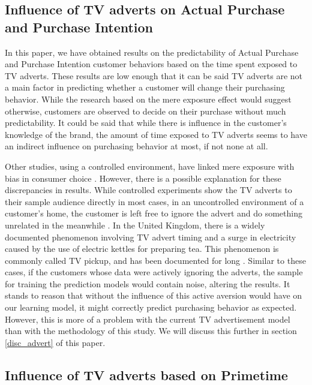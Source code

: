 \documentclass[review]{elsarticle}
\begin{document}
\subsection{Influence of TV adverts on Actual Purchase and Purchase Intention}
\label{disc_ap_pi}

In this paper, we have obtained results on the predictability of Actual Purchase and Purchase Intention customer behaviors based on the time spent exposed to TV adverts. These results are low enough that it can be said TV adverts are not a main factor in predicting whether a customer will change their purchasing behavior. While the research based on the mere exposure effect would suggest otherwise, customers are observed to decide on their purchase without much predictability. It could be said that while there is influence in the customer's knowledge of the brand, the amount of time exposed to TV adverts seems to have an indirect influence on purchasing behavior at most, if not none at all.

Other studies, using a controlled environment, have linked mere exposure with bias in consumer choice \cite{37}. However, there is a possible explanation for these discrepancies in results. While controlled experiments show the TV adverts to their sample audience directly in most cases, in an uncontrolled environment of a customer's home, the customer is left free to ignore the advert and do something unrelated in the meanwhile \cite{38}. In the United Kingdom, there is a widely documented phenomenon involving TV advert timing and a surge in electricity caused by the use of electric kettles for preparing tea. This phenomenon is commonly called TV pickup, and has been documented for long \cite{39,41}. Similar to these cases, if the customers whose data were actively ignoring the adverts, the sample for training the prediction models would contain noise, altering the results. It stands to reason that without the influence of this active aversion would have on our learning model, it might correctly predict purchasing behavior as expected. However, this is more of a problem with the current TV advertisement model than with the methodology of this study. We will discuss this further in section \ref{disc_advert} of this paper.


\subsection{Influence of TV adverts based on Primetime}
\label{disc_prime}
\end{document}
